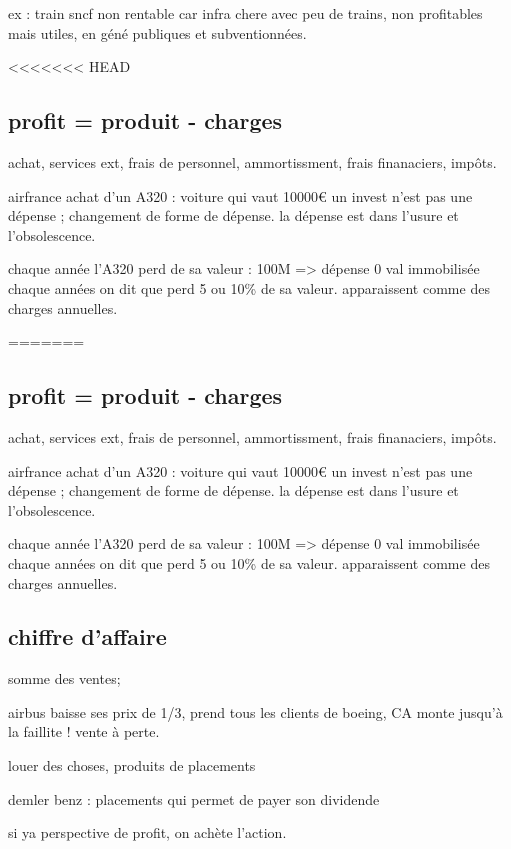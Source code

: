 \documentclass[a4paper,12pt]{article}
\begin{document}
ex : train sncf non rentable car infra chere avec peu de trains, non profitables mais utiles,
en géné publiques et subventionnées.


 
<<<<<<< HEAD

\subsection{profit = produit - charges}



achat, services ext, frais de personnel, ammortissment, frais finanaciers, impôts.


airfrance achat d'un A320 : voiture qui vaut 10000€
un invest n'est pas une dépense ; changement de forme de dépense.
la dépense est dans l'usure et l'obsolescence.

chaque année l'A320 perd de sa valeur : 100M => dépense 0 val immobilisée
chaque années on dit que perd 5 ou 10\% de  sa valeur. apparaissent comme des charges annuelles.

=======

\subsection{profit = produit - charges}



achat, services ext, frais de personnel, ammortissment, frais finanaciers, impôts.


airfrance achat d'un A320 : voiture qui vaut 10000€
un invest n'est pas une dépense ; changement de forme de dépense.
la dépense est dans l'usure et l'obsolescence.

chaque année l'A320 perd de sa valeur : 100M => dépense 0 val immobilisée
chaque années on dit que perd 5 ou 10\% de  sa valeur. apparaissent comme des charges annuelles.


\subsection{chiffre d'affaire}
somme des ventes;

airbus baisse ses prix de 1/3, prend tous les clients de boeing, CA monte jusqu'à la faillite ! vente à perte.

louer des choses,
produits de placements

demler benz : placements qui permet de payer son dividende

si ya perspective de profit, on achète l'action.
 
\end{document}

